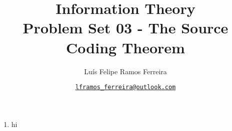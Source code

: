 \documentclass{article}
\title{Information Theory \\ \large Problem Set 03 - The Source Coding Theorem}
\author{Luís Felipe Ramos Ferreira}
\date{\href{mailto:lframos\_ferreira@outlook.com}{\texttt{lframos\_ferreira@outlook.com}}
}
\begin{document}
\maketitle

\begin{enumerate}
    \item hi
\end{enumerate}
\end{document}
